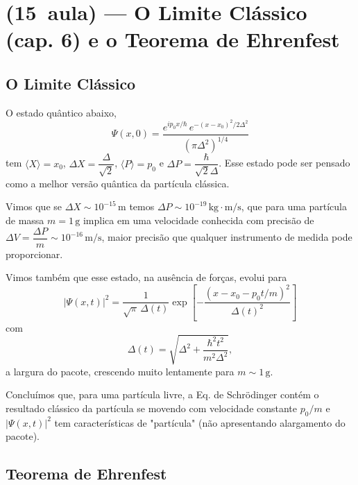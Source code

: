\section*{(15\textordfeminine\ aula) --- O Limite Clássico (cap. 6) e o Teorema de Ehrenfest}

\subsection*{O Limite Clássico}

O estado quântico abaixo,
\begin{equation}
    \Psi(x,0) = \frac{e^{ip_0 x/\hbar} \, e^{-(x-x_0)^2/2\Delta^2}}{(\pi \Delta^2)^{1/4}}
\label{eq:aula15_pacote_inicial}
\end{equation}
tem $\langle X \rangle = x_0$, $\Delta X = \dfrac{\Delta}{\sqrt{2}}$, $\langle P \rangle = p_0$ e $\Delta P = \dfrac{\hbar}{\sqrt{2}\Delta}$. Esse estado pode ser pensado como a melhor versão quântica da partícula clássica.

Vimos que se $\Delta X \sim 10^{-15}\,\text{m}$ temos $\Delta P \sim 10^{-19}\,\text{kg}\cdot\text{m/s}$, que para uma partícula de massa $m = 1\,\text{g}$ implica em uma velocidade conhecida com precisão de $\Delta V = \dfrac{\Delta P}{m} \sim 10^{-16}\,\text{m/s}$, maior precisão que qualquer instrumento de medida pode proporcionar.

Vimos também que esse estado, na ausência de forças, evolui para
\begin{equation}
    |\Psi(x,t)|^2 = \frac{1}{\sqrt{\pi}\,\Delta(t)} \exp\left[ -\frac{(x - x_0 - p_0 t/m)^2}{\Delta(t)^2} \right]
\label{eq:aula15_pacote_evoluido}
\end{equation}
com
\begin{equation}
    \Delta(t) = \sqrt{\Delta^2 + \frac{\hbar^2 t^2}{m^2 \Delta^2}},
\label{eq:aula15_delta_t}
\end{equation}
a largura do pacote, crescendo muito lentamente para $m \sim 1\,\text{g}$.

Concluímos que, para uma partícula livre, a Eq. de Schrödinger contém o resultado clássico da partícula se movendo com velocidade constante $p_0/m$ e $|\Psi(x,t)|^2$ tem características de "partícula" (não apresentando alargamento do pacote).

\subsection*{Teorema de Ehrenfest}

